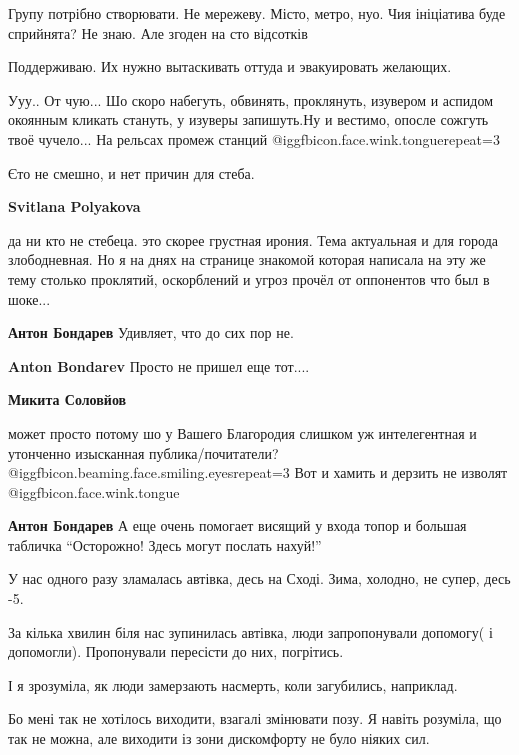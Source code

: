 \begin{itemize}

Групу потрібно створювати. Не мережеву. Місто, метро, нуо. Чия ініціатива буде
сприйнята? Не знаю. Але згоден на сто відсотків

Поддерживаю. Их нужно вытаскивать оттуда и эвакуировать желающих.


Ууу.. От чую... Шо скоро набегуть, обвинять, проклянуть, изувером и аспидом
окоянным кликать стануть, у изуверы запишуть.Ну и вестимо, опосле сожгуть твоё
чучело... На рельсах промеж станций @igg{fbicon.face.wink.tongue}{repeat=3} 

\begin{itemize} %

Єто не смешно, и нет причин для стеба.

\textbf{Svitlana Polyakova} 

да ни кто не стебеца. это скорее грустная ирония. Тема актуальная и для города
злободневная. Но я на днях на странице знакомой которая написала на эту же тему
столько проклятий, оскорблений и угроз прочёл от оппонентов что был в шоке...

\textbf{Антон Бондарев} Удивляет, что до сих пор не.

\textbf{Anton Bondarev} Просто не пришел еще тот....

\textbf{Микита Соловйов} 

может просто потому шо у Вашего Благородия слишком уж интелегентная и утонченно
изысканная публика/почитатели?  @igg{fbicon.beaming.face.smiling.eyes}{repeat=3} Вот и хамить и дерзить не изволят @igg{fbicon.face.wink.tongue} 

\textbf{Антон Бондарев} А еще очень помогает висящий у входа топор и большая табличка \enquote{Осторожно! Здесь могут послать нахуй!}
\end{itemize} %


У нас одного разу зламалась автівка, десь на Сході. Зима, холодно, не супер,
десь -5.

За кілька хвилин біля нас зупинилась автівка, люди запропонували допомогу( і
допомогли). Пропонували пересісти до них, погрітись.

І я зрозуміла, як люди замерзають насмерть, коли загубились, наприклад.

Бо мені так не хотілось виходити, взагалі змінювати позу. Я навіть розуміла, що
так не можна, але виходити із зони дискомфорту не було ніяких сил.


\end{itemize}
